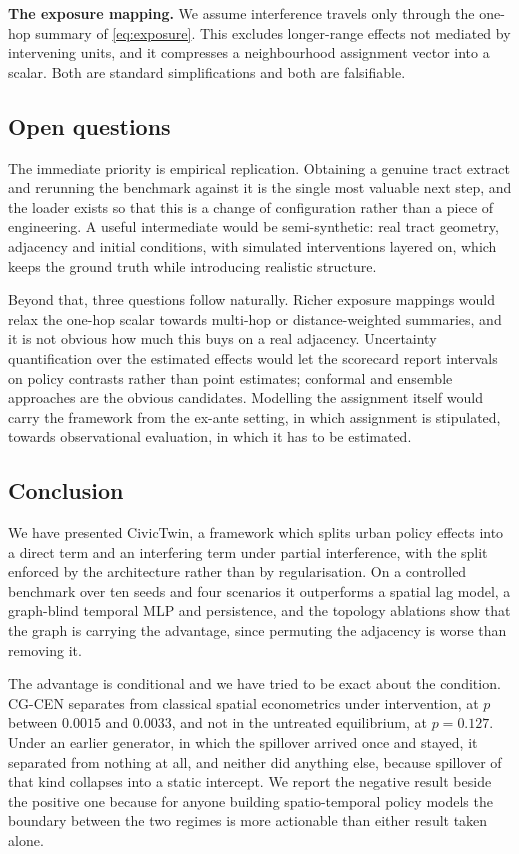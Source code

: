 \documentclass[journal]{IEEEtran}
\newcommand{\CGCEN}{CG\mbox{-}CEN}
\begin{document}
\textbf{The exposure mapping.} We assume interference travels only through the
one-hop summary of \eqref{eq:exposure}. This excludes longer-range effects not
mediated by intervening units, and it compresses a neighbourhood assignment
vector into a scalar. Both are standard simplifications
\cite{hudgens2008,forastiere2021} and both are falsifiable.

\subsection{Open questions}

The immediate priority is empirical replication. Obtaining a genuine tract
extract and rerunning the benchmark against it is the single most valuable next
step, and the loader exists so that this is a change of configuration rather
than a piece of engineering. A useful intermediate would be semi-synthetic: real
tract geometry, adjacency and initial conditions, with simulated interventions
layered on, which keeps the ground truth while introducing realistic structure.

Beyond that, three questions follow naturally. Richer exposure mappings would
relax the one-hop scalar towards multi-hop or distance-weighted summaries, and
it is not obvious how much this buys on a real adjacency. Uncertainty
quantification over the estimated effects would let the scorecard report
intervals on policy contrasts rather than point estimates; conformal and
ensemble approaches are the obvious candidates. Modelling the assignment itself
would carry the framework from the ex-ante setting, in which assignment is
stipulated, towards observational evaluation, in which it has to be estimated.

\subsection{Conclusion}

We have presented CivicTwin, a framework which splits urban policy effects into
a direct term and an interfering term under partial interference, with the split
enforced by the architecture rather than by regularisation. On a controlled
benchmark over ten seeds and four scenarios it outperforms a spatial lag model,
a graph-blind temporal MLP and persistence, and the topology ablations show that
the graph is carrying the advantage, since permuting the adjacency is worse than
removing it.

The advantage is conditional and we have tried to be exact about the condition.
\CGCEN{} separates from classical spatial econometrics under intervention, at
$p$ between $0.0015$ and $0.0033$, and not in the untreated equilibrium, at
$p = 0.127$. Under an earlier generator, in which the spillover arrived once and
stayed, it separated from nothing at all, and neither did anything else, because
spillover of that kind collapses into a static intercept. We report the negative
result beside the positive one because for anyone building spatio-temporal
policy models the boundary between the two regimes is more actionable than
either result taken alone.
\end{document}
